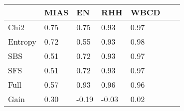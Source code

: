 \begin{tabular}{|l|l|l|l|l|l|l|}
\toprule
{} & MIAS &    EN &   RHH & WBCD \\
\midrule
Chi2    & 0.75 &  0.75 &  0.93 & 0.97 \\
Entropy & 0.72 &  0.55 &  0.93 & 0.98 \\
SBS     & 0.51 &  0.72 &  0.93 & 0.97 \\
SFS     & 0.51 &  0.72 &  0.93 & 0.97 \\
Full    & 0.57 &  0.93 &  0.96 & 0.96 \\
Gain    & 0.30 & -0.19 & -0.03 & 0.02 \\
\bottomrule
\end{tabular}
